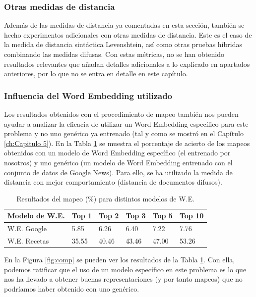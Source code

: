\subsubsection{Otras medidas de distancia}

Además de las medidas de distancia ya comentadas en esta sección, también se hecho experimentos adicionales con otras medidas de distancia. Este es el caso de la medida de distancia sintáctica Levenshtein, así como otras pruebas híbridas combinando las medidas difusas. Con estas métricas, no se han obtenido resultados relevantes que añadan detalles adicionales a lo explicado en apartados anteriores, por lo que no se entra en detalle en este capítulo.

\subsubsection{Influencia del Word Embedding utilizado}\label{WordEmbedding}

Los resultados obtenidos con el procedimiento de mapeo también nos pueden ayudar a analizar la eficacia de utilizar un Word Embedding específico para este problema y no uno genérico ya entrenado (tal y como se mostró en el Capítulo \ref{ch:Capitulo 5}). En la Tabla \ref{tablecomp} se muestra el porcentaje de acierto de los mapeos obtenidos con un modelo de Word Embedding específico (el entrenado por nosotros) y uno genérico (un modelo de Word Embedding entrenado con el conjunto de datos de Google News). Para ello, se ha utilizado la medida de distancia con mejor comportamiento (distancia de documentos difusos). 

\setlength{\tabcolsep}{4pt} 
\begin{table}[H]
\centering
\begin{tabular}{l|l|l|l|l|l}
\textbf{Modelo de W.E.} & \textbf{Top 1} &\textbf{Top 2}& \textbf{Top 3} & \textbf{Top 5} & \textbf{Top 10}\\ \hline
W.E. Google & 5.85 & 6.26 & 6.40 & 7.22 & 7.76 \\
W.E. Recetas & 35.55 & 40.46 & 43.46 & 47.00 & 53.26 \\ 
\end{tabular}
\caption{Resultados del mapeo ($\%$) para distintos modelos de W.E.}\label{tablecomp}
\end{table}


En la Figura \ref{fig:comp} se pueden ver los resultados de la Tabla \ref{tablecomp}. Con ella, podemos ratificar que el uso de un modelo específico en este problema es lo que nos ha llevado a obtener buenas representaciones (y por tanto mapeos) que no podríamos haber obtenido con uno genérico.

